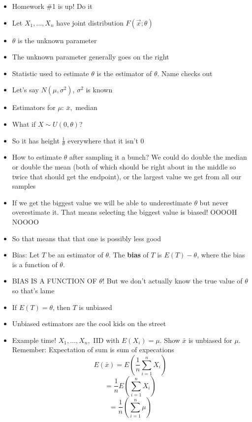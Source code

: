 \documentclass{article}
\begin{document}
  \begin{itemize}
    \item Homework \#1 is up! Do it
    \item Let $ X_1, \ldots, X_n $ have joint distribution $ F( \vec{x}; \theta) $
    \item $ \theta $ is the unknown parameter
    \item The unknown parameter generally goes on the right
    \item Statistic used to estimate $ \theta $ is the estimator of  $ \theta $. Name checks out
    \item Let's say $ N(\mu, \sigma^2) $,  $ \sigma^2 $ is known
    \item Estimators for  $ \mu $:  $ \bar{x}, $ median
    \item What if $ X \sim U (0, \theta) $?
    \item So it has height  $ \frac{1}{\theta} $ everywhere that it isn't 0
    \item How to estimate $ \theta $ after sampling it a bunch? We could do double the median or double the mean (both of which should be right about in the middle so twice that should get the endpoint), or the largest value we get from all our samples
    \item If we get the biggest value we will be able to underestimate $ \theta $ but never overestimate it. That means selecting the biggest value is biased! OOOOH NOOOO
    \item So that means that that one is possibly less good
    \item Bias: Let  $ T $ be an estimator of  $ \theta $. The  \textbf{bias} of $ T $ is  $ E(T) - \theta $, where the bias is a function  of $ \theta $.
    \item BIAS IS A FUNCTION OF $ \theta $! But we don't actually know the true value of $ \theta $ so that's lame
    \item If $ E(T) = \theta $, then  $ T $ is unbiased
    \item Unbiased estimators are the cool kids on the street
    \item Example time!  $ X_1, \ldots, X_n,  $ IID with $ E(X_i) = \mu $. Show  $  \bar{x} $ is unbiased for $ \mu $. \\
      Remember: Expectation of sum is sum of expecations
      \[
        E( \bar{x}) = E \left(\frac{1}{n} \sum_{i = 1}^{n} X_i \right) 
      \]
      \[
        = \frac{1}{n} E \left( \sum_{i = 1}^{n} X_i \right)
      \] 
      \[
        = \frac{1}{n} \left( \sum_{i = 1}^{n}\mu \right)
\]
\end{itemize}
\end{document}
